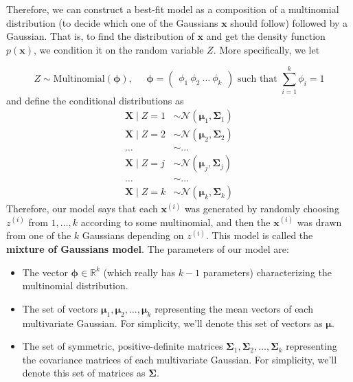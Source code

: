       Therefore, we can construct a best-fit model as a composition of a multinomial distribution (to decide which one of the Gaussians $\mathbf{x}$ should follow) followed by a Gaussian. That is, to find the distribution of $\mathbf{x}$ and get the density function $p(\mathbf{x})$, we condition it on the random variable $Z$. More specifically, we let

      \[Z \sim \text{Multinomial}(\boldsymbol{\phi}), \;\;\;\;\; \boldsymbol{\phi} = \begin{pmatrix} \phi_1 \ \phi_2 \ \ldots \ \phi_k \end{pmatrix} \text{ such that } \sum_{i=1}^k \phi_i = 1\]
      and define the conditional distributions as
      \begin{align*}
        \mathbf{X} \mid Z = 1 & \sim \mathcal{N}(\boldsymbol{\mu}_1, \boldsymbol{\Sigma}_1) \\
        \mathbf{X} \mid Z = 2 & \sim \mathcal{N}(\boldsymbol{\mu}_2, \boldsymbol{\Sigma}_2) \\
        \ldots & \sim \ldots \\
        \mathbf{X} \mid Z = j & \sim \mathcal{N}(\boldsymbol{\mu}_j, \boldsymbol{\Sigma}_j) \\
        \ldots & \sim \ldots \\
        \mathbf{X} \mid Z = k & \sim \mathcal{N}(\boldsymbol{\mu}_k, \boldsymbol{\Sigma}_k)
      \end{align*}
      Therefore, our model says that each $\mathbf{x}^{(i)}$ was generated by randomly choosing $z^{(i)}$ from ${1, \ldots, k}$ according to some multinomial, and then the $\mathbf{x}^{(i)}$ was drawn from one of the $k$ Gaussians depending on $z^{(i)}$. This model is called the \textbf{mixture of Gaussians model}. The parameters of our model are: 

      \begin{itemize}
        \item The vector $\boldsymbol{\phi} \in \mathbb{R}^k$ (which really has $k-1$ parameters) characterizing the multinomial distribution.
        \item The set of vectors $\boldsymbol{\mu}_1, \boldsymbol{\mu}_2, \ldots, \boldsymbol{\mu}_k$ representing the mean vectors of each multivariate Gaussian. For simplicity, we'll denote this set of vectors as $\bm{\mu}$.
        \item The set of symmetric, positive-definite matrices $\boldsymbol{\Sigma}_1, \boldsymbol{\Sigma}_2, \ldots, \boldsymbol{\Sigma}_k$ representing the covariance matrices of each multivariate Gaussian. For simplicity, we'll denote this set of matrices as $\bm{\Sigma}$.
      \end{itemize}

